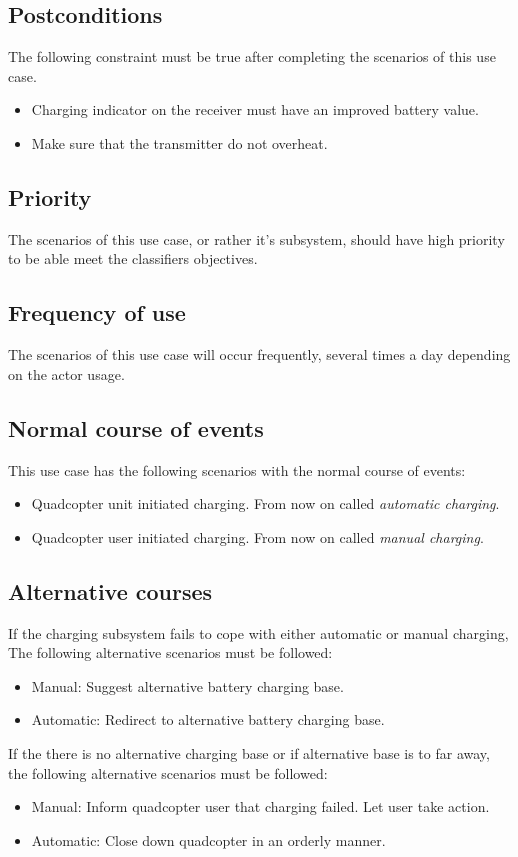 \documentclass[a4paper]{article}
\begin{document}
\subsection{Postconditions}
The following constraint must be true after completing the scenarios of this use case.
\begin{itemize}
	\item Charging indicator on the receiver must have an improved battery value.
	\item Make sure that the transmitter do not overheat.
\end{itemize}
\subsection{Priority}
The scenarios of this use case, or rather it's subsystem, should have high priority to be able meet the classifiers objectives.
\subsection{Frequency of use}
The scenarios of this use case will occur frequently, several times a day depending on the actor usage.
\subsection{Normal course of events}
This use case has the following scenarios with the normal course of events:
\begin{itemize}
	\item Quadcopter unit initiated charging. From now on called \textit{automatic charging}.
	\item Quadcopter user initiated charging. From now on called \textit{manual charging}.
\end{itemize}
\subsection{Alternative courses}
If the charging subsystem fails to cope with either automatic or manual charging,
The following alternative scenarios must be followed:
\begin{itemize}
	\item Manual: Suggest alternative battery charging base.
	\item Automatic: Redirect to alternative battery charging base.
\end{itemize}
If the there is no alternative charging base or if alternative base is to far away,
the following alternative scenarios must be followed:
\begin{itemize}
	\item Manual: Inform quadcopter user that charging failed. Let user take action.
	\item Automatic: Close down quadcopter in an orderly manner.
\end{itemize}
\end{document}
